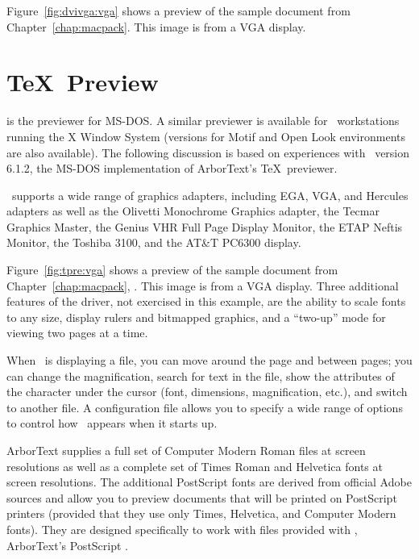 Figure~\ref{fig:dvivga:vga}
shows a preview of the sample document from
Chapter~\ref{chap:macpack}.  This image is from a VGA display.  


\section{\protect\TeX\ Preview}
\label{sec:arb:preview}
\def\tpre{}

\tpre{} is 
the   previewer for MS-DOS.  A similar previewer
is available for \Unix\ workstations running the X Window System (versions for
Motif and Open Look environments are also available).
The following discussion is based on experiences with \tpre\
version 6.1.2, the MS-DOS implementation of ArborText's \TeX\
previewer.

\tpre\ supports a wide range of graphics adapters, including EGA, VGA,
and Hercules adapters as well as the Olivetti Monochrome Graphics
adapter, the Tecmar Graphics Master, the Genius VHR Full Page Display
Monitor, the ETAP Neftis Monitor, the Toshiba 3100, and the AT\&T
PC6300 display.

Figure~\ref{fig:tpre:vga}
shows a preview of the sample document from
Chapter~\ref{chap:macpack}, {\it {}}.  This image
is from a VGA display.  Three additional features of the driver, not exercised
in this example, are the ability to scale fonts to any size, display rulers
and bitmapped graphics, and a ``two-up'' mode for viewing two
pages at a time.


When \tpre\ is displaying a  file, you can move around the page
and between pages; you can change the magnification, search for text
in the \ext{DVI} file, show the attributes of the character under the
cursor (font, dimensions, magnification, etc.), and switch to another file.
A configuration file allows you to specify a wide range of options to
control how \tpre\ appears when it starts up.

ArborText supplies a full set of Computer Modern Roman  files
at screen resolutions as well as a complete set of Times Roman and
Helvetica fonts at screen resolutions.  The additional PostScript
fonts are derived from official Adobe sources and allow you to preview
documents that will be printed on PostScript printers (provided that
they use only Times, Helvetica, and Computer Modern fonts).  They are
designed specifically to work with \ext{TFM} files provided with
\program{DVILASER/PS}, ArborText's PostScript \dvidriver.

